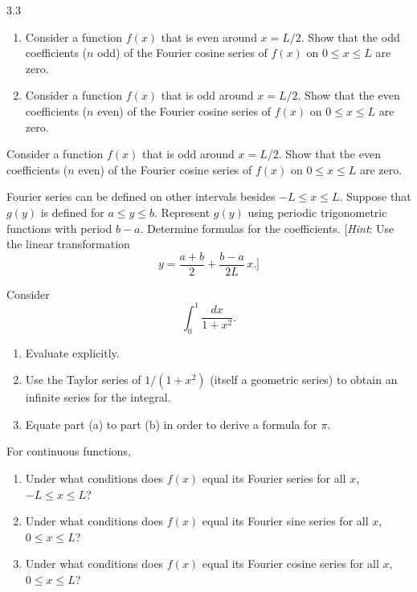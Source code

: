 \begin{exercises}{3.3}
\item
\begin{enumerate}
\item[\textbf{(a)}] Consider a function $f(x)$ that is even around $x = L/2$.  Show that the odd coefficients ($n$ odd) of the Fourier cosine series of $f(x)$ on $0 \le x \le L$ are zero.
\item[\textbf{(b)}] Consider a function $f(x)$ that is odd around $x = L/2$.  Show that the even coefficients ($n$ even) of the Fourier cosine series of $f(x)$ on $0 \le x \le L$ are zero.
\end{enumerate}

\item Consider a function $f(x)$ that is odd around $x = L/2$.  Show that the even coefficients ($n$ even) of the Fourier cosine series of $f(x)$ on $0 \le x \le L$ are zero.

\item Fourier series can be defined on other intervals besides $-L \le x \le L$.  Suppose that $g(y)$ is defined for $a \le y \le b$.  Represent $g(y)$ using periodic trigonometric functions with period $b - a$.  Determine formulas for the coefficients.  [\textit{Hint}: Use the linear transformation
\[
y = \frac{a+b}{2} + \frac{b-a}{2L}\,x.\text{]}
\]

\item Consider
\[
\int_0^1 \frac{dx}{1 + x^2}.
\]
\begin{enumerate}
\item[\textbf{(a)}] Evaluate explicitly.
\item[\textbf{(b)}] Use the Taylor series of $1/(1+x^2)$ (itself a geometric series) to obtain an infinite series for the integral.
\item[\textbf{(c)}] Equate part (a) to part (b) in order to derive a formula for $\pi$.
\end{enumerate}

\item For continuous functions,
\begin{enumerate}
\item[\textbf{(a)}] Under what conditions does $f(x)$ equal its Fourier series for all $x$, $-L \le x \le L$?
\item[\textbf{(b)}] Under what conditions does $f(x)$ equal its Fourier sine series for all $x$, $0 \le x \le L$?
\item[\textbf{(c)}] Under what conditions does $f(x)$ equal its Fourier cosine series for all $x$, $0 \le x \le L$?
\end{enumerate}
\end{exercises}

